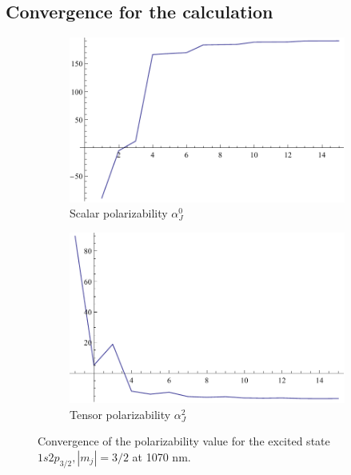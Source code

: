\subsection{Convergence for the calculation}

\begin{figure}[h]
\centering
\begin{subfigure}[b]{0.4\textwidth}
                \includegraphics[width=\textwidth]{alphascalarconvexcited}
                \caption{Scalar polarizability $\alpha^0_J$}
\end{subfigure}
\begin{subfigure}[b]{0.4\textwidth}
               \includegraphics[width=\textwidth]{alphatensorconvexcited}
                \caption{Tensor polarizability $\alpha^2_J$}
\end{subfigure}


\caption{Convergence of the polarizability value for the excited state $1s2p_{3/2}, |m_j|=3/2$ at 1070 nm.}
\label{alphaconv}
\end{figure}


